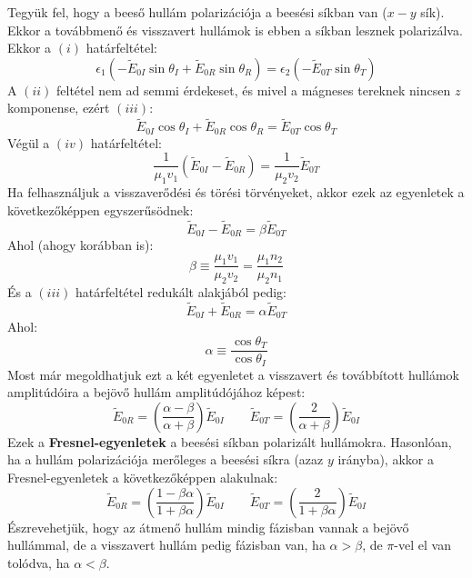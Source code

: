 \documentclass[../main.tex]{subfiles}
\begin{document}
Tegyük fel, hogy a beeső hullám polarizációja a beesési síkban van ($x-y$ sík). Ekkor a továbbmenő és visszavert hullámok is ebben a síkban lesznek polarizálva.
Ekkor a $(i)$ határfeltétel:
\begin{equation}
    \epsilon_1 (- \tilde{E}_{0I} \sin \theta_I + \tilde{E}_{0R} \sin \theta_R) = \epsilon_2 (- \tilde{E}_{0T} \sin \theta_T)
\end{equation}
A $(ii)$ feltétel nem ad semmi érdekeset, és mivel a mágneses tereknek nincsen $z$ komponense, ezért $(iii)$:
\begin{equation}
    \tilde{E}_{0I} \cos \theta_I + \tilde{E}_{0R} \cos \theta_R = \tilde{E}_{0T} \cos \theta_T
\end{equation}
Végül a $(iv)$ határfeltétel:
\begin{equation}
    \frac{1}{\mu_1 v_1} \left( \tilde{E}_{0I} - \tilde{E}_{0R} \right) = \frac{1}{\mu_2 v_2} \tilde{E}_{0T}
\end{equation}
Ha felhasználjuk a visszaverődési és törési törvényeket, akkor ezek az egyenletek a következőképpen egyszerűsödnek:
\begin{equation}
    \tilde{E}_{0I} - \tilde{E}_{0R} = \beta \tilde{E}_{0T}
\end{equation}
Ahol (ahogy korábban is):
\begin{equation}
    \beta \equiv \frac{\mu_1 v_1}{\mu_2 v_2} = \frac{\mu_1 n_2}{\mu_2 n_1}
\end{equation}
És a $(iii)$ határfeltétel redukált alakjából pedig:
\begin{equation}
    \tilde{E}_{0I} + \tilde{E}_{0R} = \alpha \tilde{E}_{0T}
\end{equation}
Ahol:
\begin{equation}
    \alpha \equiv \frac{\cos \theta_T}{\cos \theta_I}
\end{equation}
Most már megoldhatjuk ezt a két egyenletet a visszavert és továbbított hullámok amplitúdóira a bejövő hullám amplitúdójához képest:
\begin{equation}
    \boxed{\tilde{E}_{0R} = \left( \frac{\alpha - \beta}{\alpha + \beta} \right) \tilde{E}_{0I} \qquad \tilde{E}_{0T} = \left( \frac{2}{\alpha + \beta} \right) \tilde{E}_{0I}}
\end{equation}
Ezek a \textbf{Fresnel-egyenletek} a beesési síkban polarizált hullámokra. Hasonlóan, ha a hullám polarizációja merőleges a beesési síkra (azaz $y$ irányba), akkor a Fresnel-egyenletek a következőképpen alakulnak:
\begin{equation}
    \boxed{\tilde{E}_{0R} = \left( \frac{1 - \beta \alpha}{1 + \beta \alpha} \right) \tilde{E}_{0I} \qquad \tilde{E}_{0T} = \left( \frac{2}{1 + \beta \alpha} \right) \tilde{E}_{0I}}
\end{equation}
Észrevehetjük, hogy az átmenő hullám mindig fázisban vannak a bejövő hullámmal, de a visszavert hullám pedig fázisban van, ha $\alpha > \beta$, de $\pi$-vel el van tolódva, ha $\alpha < \beta$.
\end{document}
